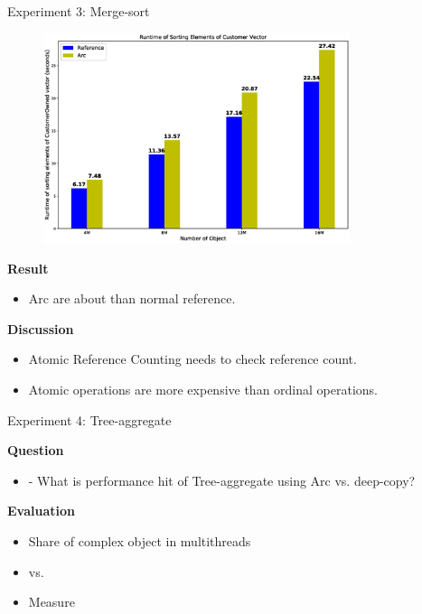 \documentclass[9pt]{beamer}
\begin{document}
\begin{frame}[fragile]{Experiment 3: Merge-sort}
    \vspace{-0.5cm}
    \begin{figure}[hp]
        \centering
        \begin{center}
                \includegraphics[width=0.8\textwidth]{images/rust_merge_sort.eps}
                \captionsetup{labelformat=empty}
        \end{center}
    \end{figure}
    \vspace{-0.5cm}
    \textbf{Result}
    \begin{itemize}
        \item Arc are about  than normal reference.
    \end{itemize}
    \textbf{Discussion}
    \begin{itemize}
        \item Atomic Reference Counting needs to check reference count.
        \item Atomic operations are more expensive than ordinal operations.
    \end{itemize}

\end{frame}


\begin{frame}[fragile]{Experiment 4: Tree-aggregate}

    \textbf{Question}
    \begin{itemize}
        \item - What is performance hit of Tree-aggregate using Arc vs. deep-copy?
    \end{itemize}

    \vspace{0.5cm}

    \textbf{Evaluation}
    \begin{itemize}
        \item Share  of complex object in multithreads
        \item {} vs. 
        \item Measure 
    \end{itemize}

\end{frame}
\end{document}
